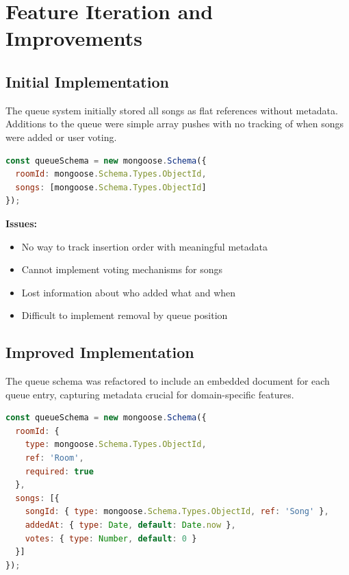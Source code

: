 \documentclass[11pt,a4paper]{article}
\begin{document}
\section{Feature Iteration and Improvements}

\subsection{Initial Implementation}

The queue system initially stored all songs as flat references without metadata. Additions to the queue were simple array pushes with no tracking of when songs were added or user voting.

\begin{lstlisting}[language=javascript, caption=Early Queue Model (April 8 Initial Backend Setup)]
const queueSchema = new mongoose.Schema({
  roomId: mongoose.Schema.Types.ObjectId,
  songs: [mongoose.Schema.Types.ObjectId]
});
\end{lstlisting}

\textbf{Issues:}
\begin{itemize}
    \item No way to track insertion order with meaningful metadata
    \item Cannot implement voting mechanisms for songs
    \item Lost information about who added what and when
    \item Difficult to implement removal by queue position
\end{itemize}

\subsection{Improved Implementation}

The queue schema was refactored to include an embedded document for each queue entry, capturing metadata crucial for domain-specific features.

\begin{lstlisting}[language=javascript, caption=Enhanced Queue Model (April 20 API Improvements - Commit ee3146c6)]
const queueSchema = new mongoose.Schema({
  roomId: { 
    type: mongoose.Schema.Types.ObjectId, 
    ref: 'Room', 
    required: true 
  },
  songs: [{
    songId: { type: mongoose.Schema.Types.ObjectId, ref: 'Song' },
    addedAt: { type: Date, default: Date.now },
    votes: { type: Number, default: 0 }
  }]
});
\end{lstlisting}
\end{document}
